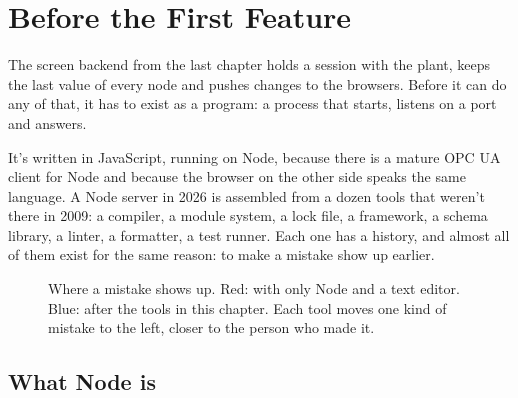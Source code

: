 \chapter{Before the First Feature}

The screen backend from the last chapter holds a session with the plant, keeps
the last value of every node and pushes changes to the browsers. Before it can
do any of that, it has to exist as a program: a process that starts, listens on
a port and answers.

It's written in JavaScript, running on Node, because there is a mature OPC UA
client for Node and because the browser on the other side speaks the same
language. A Node server in 2026 is assembled from a dozen tools that weren't
there in 2009: a compiler, a module system, a lock file, a framework, a schema
library, a linter, a formatter, a test runner. Each one has a history, and
almost all of them exist for the same reason: to make a mistake show up
earlier.

\begin{figure}[htbp]
\centering
{}
\caption{Where a mistake shows up. Red: with only Node and a text editor. Blue:
after the tools in this chapter. Each tool moves one kind of mistake to the
left, closer to the person who made it.}
\end{figure}

\section{What Node is}

